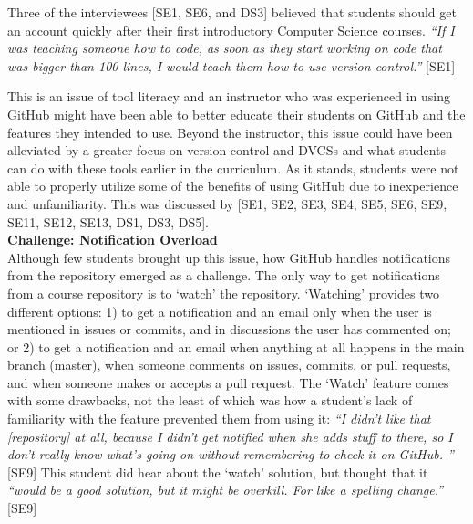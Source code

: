 Three of the interviewees [SE1, SE6, and DS3] believed that students should get an account quickly after their first introductory Computer Science courses. \textit{``If I was teaching someone how to code, as soon as they start working on code that was bigger than 100 lines, I would teach them how to use version control.''} [SE1]



This is an issue of tool literacy and an instructor who was experienced in using GitHub might have been able to better educate their students on GitHub and the features they intended to use. Beyond the instructor, this issue could have been alleviated by a greater focus on version control and DVCSs and what students can do with these tools earlier in the curriculum. As it stands, students were not able to properly utilize some of the benefits of using GitHub due to inexperience and unfamiliarity. This was discussed by [SE1, SE2, SE3, SE4, SE5, SE6, SE9, SE11, SE12, SE13, DS1, DS3, DS5]. \\

\textbf{Challenge: Notification Overload} \\
Although few students brought up this issue, how GitHub handles notifications from the repository emerged as a challenge. The only way to get notifications from a course repository is to `watch' the repository. `Watching' provides two different options: 1) to get a notification and an email only when the user is mentioned in issues or commits, and in discussions the user has commented on; or 2) to get a notification and an email when anything at all happens in the main branch (master), when someone comments on issues, commits, or pull requests, and when someone makes or accepts a pull request. The `Watch' feature comes with some drawbacks, not the least of which was how a student's lack of familiarity with the feature prevented them from using it: \textit{``I didn't like that [repository] at all, because I didn't get notified when she adds stuff to there, so I don't really know what's going on without remembering to check it on GitHub. ''} [SE9] This student did hear about the `watch' solution, but thought that it \textit{``would be a good solution, but it might be overkill. For like a spelling change.''} [SE9]

